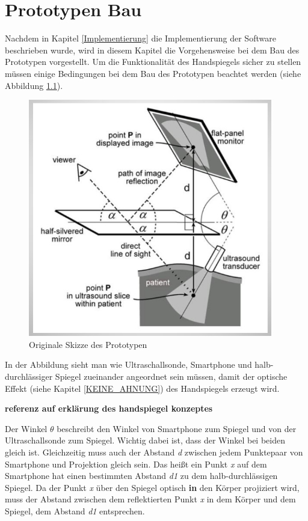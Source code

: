 \chapter{Prototypen Bau}\label{chap:Prototypen_Bau}
Nachdem in Kapitel \ref{Implementierung} die Implementierung der Software beschrieben wurde, wird in diesem Kapitel die Vorgehensweise bei dem Bau des Prototypen vorgestellt. Um die Funktionalität des Handspiegels sicher zu stellen müssen einige Bedingungen bei dem Bau des Prototypen beachtet werden (siehe Abbildung \ref{fig:protoyp_skizze_ori}).
\begin{figure}[h]
	\centering
	\includegraphics[width=0.95\textwidth]{Prototypen_Bau/Sketch1}
	\caption{Originale Skizze des Prototypen}
	\label{fig:protoyp_skizze_ori}
\end{figure}
In der Abbildung sieht man wie Ultraschallsonde, Smartphone und halb-durchlässiger Spiegel zueinander angeordnet sein müssen, damit der optische Effekt (siehe Kapitel \ref{KEINE_AHNUNG}) des Handspiegels erzeugt wird.\\ \begin{Large}
\textbf{referenz auf erklärung des handspiegel konzeptes }
\end{Large}
Der Winkel $\theta$ beschreibt den Winkel von Smartphone zum Spiegel und von der Ultraschallsonde zum Spiegel. Wichtig dabei ist, dass der Winkel bei beiden gleich ist. Gleichzeitig muss auch der Abstand \textit{d} zwischen jedem Punktepaar von Smartphone und Projektion gleich sein. Das heißt ein Punkt \textit{x} auf dem Smartphone hat einen bestimmten Abstand \textit{d1} zu dem halb-durchlässigen Spiegel. Da der Punkt \textit{x} über den Spiegel optisch \textbf{in} den Körper projiziert wird, muss der Abstand zwischen dem reflektierten Punkt \textit{x} in dem Körper und dem Spiegel, dem Abstand \textit{d1} entsprechen.\\
